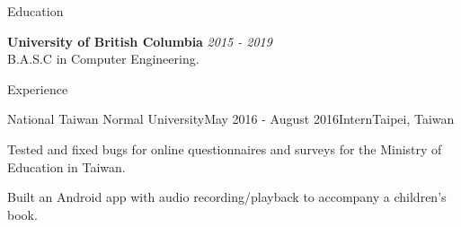 \documentclass{resume} %
\begin{document}

\begin{rSection}{Education}

{\bf University of British Columbia} \hfill {\em 2015 - 2019} \\ 
B.A.S.C in Computer Engineering.

\end{rSection}
\begin{rSection}{Experience}

\begin{rSubsection}{National Taiwan Normal University}{May 2016 - August 2016}{Intern}{Taipei, Taiwan}
\item Tested and fixed bugs for online questionnaires and surveys for the Ministry of Education in Taiwan.
\item Built an Android app with audio recording/playback to accompany a children's book.
\end{rSubsection}

\end{rSection}


\end{document}
